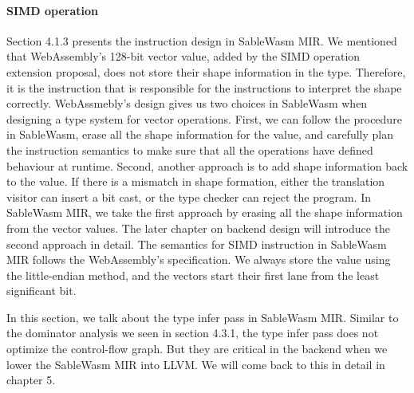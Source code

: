 \paragraph{SIMD operation}
Section 4.1.3 presents the instruction design in SableWasm MIR. We mentioned that WebAssembly's 128-bit vector value, added by the SIMD operation extension proposal, does not store their shape information in the type. Therefore, it is the instruction that is responsible for the instructions to interpret the shape correctly. WebAssmebly's design gives us two choices in SableWasm when designing a type system for vector operations. First, we can follow the procedure in SableWasm, erase all the shape information for the value, and carefully plan the instruction semantics to make sure that all the operations have defined behaviour at runtime. Second, another approach is to add shape information back to the value. If there is a mismatch in shape formation, either the translation visitor can insert a bit cast, or the type checker can reject the program. In SableWasm MIR, we take the first approach by erasing all the shape information from the vector values. The later chapter on backend design will introduce the second approach in detail. The semantics for SIMD instruction in SableWasm MIR follows the WebAssembly's specification. We always store the value using the little-endian method, and the vectors start their first lane from the least significant bit.

In this section, we talk about the type infer pass in SableWasm MIR. Similar to the dominator analysis we seen in section 4.3.1, the type infer pass does not optimize the control-flow graph. But they are critical in the backend when we lower the SableWasm MIR into LLVM. We will come back to this in detail in chapter 5.